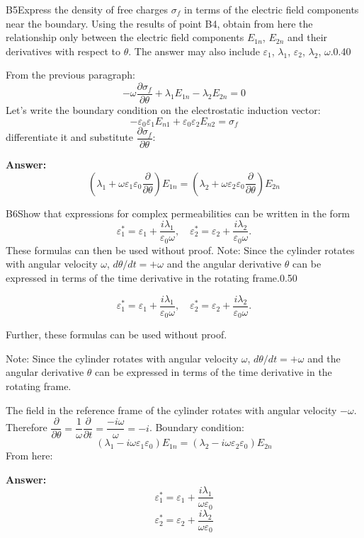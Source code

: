 \documentclass[11pt,a4paper]{article}
\begin{document}
\begin{solcard}{B5}{Express the density of free charges $\sigma_f$ in terms of the electric field components near the boundary. Using the results of point B4, obtain from here the relationship only between the electric field components $E_{1n}$, $E_{2n}$ and their derivatives with respect to $\theta$. The answer may also include $\varepsilon_1$, $\lambda_1$, $\varepsilon_2$, $\lambda_2$, $\omega$.}{0.40}

From the previous paragraph: \[-\omega\dfrac{\partial \sigma_f}{\partial \theta}+ \lambda_1E_{1n} - \lambda_2E_{2n} = 0\]Let's write the boundary condition on the electrostatic induction vector: \[-\varepsilon_0\varepsilon_1E_{n1} + \varepsilon_0\varepsilon_2E_{n2} = \sigma_f\]differentiate it and substitute $\dfrac{\partial \sigma_f}{\partial \theta}$:

\par\smallskip\noindent\textbf{Answer:} \[\left(\lambda_1+\omega\varepsilon_1\varepsilon_0\dfrac{\partial}{\partial \theta}\right)E_{1n}=\left(\lambda_2+\omega\varepsilon_2\varepsilon_0\dfrac{\partial}{\partial \theta}\right)E_{2n}\]
\end{solcard}

\begin{solcard}{B6}{Show that expressions for complex permeabilities can be written in the form \[ \varepsilon_1^* = \varepsilon_1 + \frac{i \lambda_1}{\varepsilon_0 \omega}, \quad  \varepsilon_2^* = \varepsilon_2 + \frac{i \lambda_2}{\varepsilon_0 \omega}.\] These formulas can then be used without proof. Note: Since the cylinder rotates with angular velocity $\omega$, $d\theta/dt = + \omega$ and the angular derivative $\theta$ can be expressed in terms of the time derivative in the rotating frame.}{0.50}

\[ \varepsilon_1^* = \varepsilon_1 + \frac{i \lambda_1}{\varepsilon_0 \omega}, \quad  \varepsilon_2^* = \varepsilon_2 + \frac{i \lambda_2}{\varepsilon_0 \omega}.\]


Further, these formulas can be used without proof.


Note: Since the cylinder rotates with angular velocity $\omega$, $d\theta/dt = + \omega$ and the angular derivative $\theta$ can be expressed in terms of the time derivative in the rotating frame.


The field in the reference frame of the cylinder rotates with angular velocity $-\omega$. Therefore $\dfrac{\partial}{\partial \theta}=\dfrac{1}{\omega}\dfrac{\partial}{\partial t}=\dfrac{-i\omega}{\omega}=-i$. Boundary condition: \[\left(\lambda_1-i\omega\varepsilon_1\varepsilon_0\right)E_{1n}=\left(\lambda_2-i\omega\varepsilon_2\varepsilon_0\right)E_{2n}\]From here:

\par\smallskip\noindent\textbf{Answer:} \[\varepsilon_1^*=\varepsilon_1+\dfrac{i\lambda_1}{\omega\varepsilon_0}\]\[\varepsilon_2^*=\varepsilon_2+\dfrac{i\lambda_2}{\omega\varepsilon_0}\]
\end{solcard}
\end{document}

